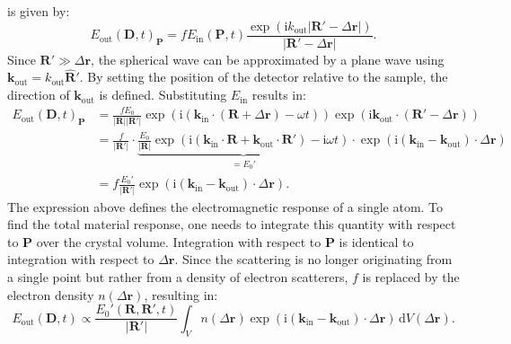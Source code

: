 is given by:
\begin{equation}
	E_{\mathrm{out}}(\mathbf{D}, t)_{\mathbf{P}}=f E_{\mathrm{in}}(\mathbf{P},t) \frac{\exp(\mathrm{i}k_{\mathrm{out}}\lvert
	\mathbf{R}' -\Delta \mathbf{r}\rvert )}{\lvert \mathbf{R}'-\Delta \mathbf{r} \rvert
	}.
\end{equation}
Since $\mathbf{R}'\gg \Delta \mathbf{r}$, the spherical wave can be approximated by
a plane wave using $\mathbf{k}_{\mathrm{out}}=k_{\mathrm{out}}\hat{\mathbf{R}}'$.
By setting the position of the detector relative to the sample, the direction of $\mathbf{k}
_{\mathrm{out}}$ is defined. Substituting $E_{\mathrm{in}}$ results in:
\begin{equation}
	\begin{aligned}
		E_{\mathrm{out}}(\mathbf{D}, t)_{\mathbf{P}} & =\frac{f E_{0}}{\lvert \mathbf{R} \rvert \lvert \mathbf{R}' \rvert }\exp\left(\mathrm{i}\left(\mathbf{k}_{\mathrm{in}}\cdot(\mathbf{R}+\Delta \mathbf{r})-\omega t\right)\right) \exp\left(\mathrm{i}\mathbf{k}_{\mathrm{out}}\cdot(\mathbf{R}'-\Delta \mathbf{r})\right)                                                                                              \\
		                                             & =\frac{f}{\lvert \mathbf{R}' \rvert }\cdot \underbrace{ \frac{E_{0}}{\lvert \mathbf{R} \rvert } \exp\left(\mathrm{i}\left(\mathbf{k}_{\mathrm{in}}\cdot\mathbf{R}+\mathbf{k}_{\mathrm{out}}\cdot\mathbf{R}'\right)-\mathrm{i}\omega t\right) }_{ =E_{0}' }\cdot \exp\left(\mathrm{i}(\mathbf{k}_{\mathrm{in}}-\mathbf{k}_{\mathrm{out}})\cdot \Delta \mathbf{r}\right) \\
		                                             & =f \frac{E_{0}'}{\lvert \mathbf{R}' \rvert }\exp\left(\mathrm{i}(\mathbf{k}_{\mathrm{in}}-\mathbf{k}_{\mathrm{out}})\cdot\Delta \mathbf{r}\right).
	\end{aligned}
\end{equation}
The expression above defines the electromagnetic response of a single atom. To
find the total material response, one needs to integrate this quantity with respect
to $\mathbf{P}$ over the crystal volume. Integration with respect to
$\mathbf{P}$ is identical to integration with respect to $\Delta \mathbf{r}$. Since
the scattering is no longer originating from a single point but rather from a density
of electron scatterers, $f$ is replaced by the electron density
$n(\Delta \mathbf{r})$, resulting in:
\begin{equation}
	E_{\mathrm{out}}(\mathbf{D}, t) \propto \frac{E_{0}'(\mathbf{R}, \mathbf{R}', t)}{\lvert
	\mathbf{R} '\rvert }\int_{V}n(\Delta \mathbf{r}) \exp\left(\mathrm{i}(\mathbf{k}
	_{\mathrm{in}}-\mathbf{k}_{\mathrm{out}})\cdot\Delta \mathbf{r}\right ) \, \mathrm{d}
	V(\Delta \mathbf{r}).
\end{equation}
